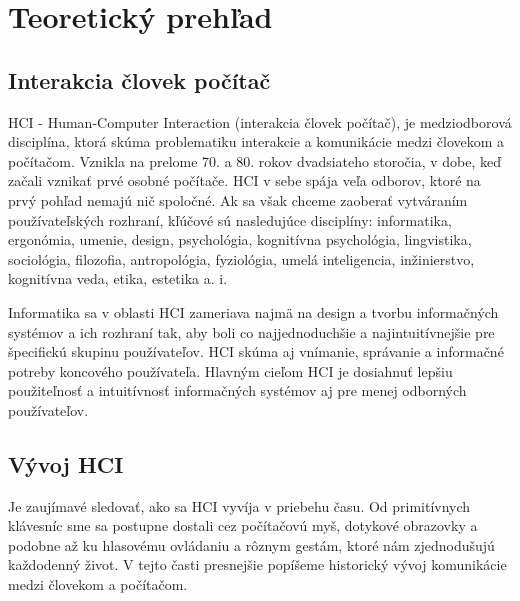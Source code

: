 \chapter{Teoretický prehľad}

\section{Interakcia človek počítač}
HCI - Human-Computer Interaction (interakcia človek počítač), je medziodborová disciplína, ktorá skúma problematiku interakcie a komunikácie medzi človekom a počítačom.
Vznikla na prelome 70. a 80. rokov dvadsiateho storočia, v dobe, keď začali vznikať prvé osobné počítače.
HCI v sebe spája veľa odborov, ktoré na prvý pohľad nemajú nič spoločné. 
Ak sa však chceme zaoberať vytváraním používateľských rozhraní, kľúčové sú nasledujúce disciplíny: informatika, ergonómia, umenie, design, psychológia, kognitívna psychológia, lingvistika, sociológia, filozofia, antropológia, fyziológia, umelá inteligencia, inžinierstvo, kognitívna veda, etika, estetika a. i.

Informatika sa v oblasti HCI zameriava najmä na design a tvorbu informačných systémov a ich rozhraní tak, aby boli co najjednoduchšie a najintuitívnejšie pre špecifickú skupinu používateľov.
HCI skúma aj vnímanie, správanie a informačné potreby koncového používateľa. 
Hlavným cieľom HCI je dosiahnuť lepšiu použiteľnosť a intuitívnosť informačných systémov aj pre menej odborných používateľov. \cite{HCI}

\section{Vývoj HCI}
Je zaujímavé sledovať, ako sa HCI vyvíja v priebehu času. 
Od primitívnych klávesníc sme sa postupne dostali cez počítačovú myš, dotykové obrazovky a podobne až ku hlasovému ovládaniu a rôznym gestám, ktoré nám zjednodušujú každodenný život.
V tejto časti presnejšie popíšeme historický vývoj komunikácie medzi človekom a počítačom.

